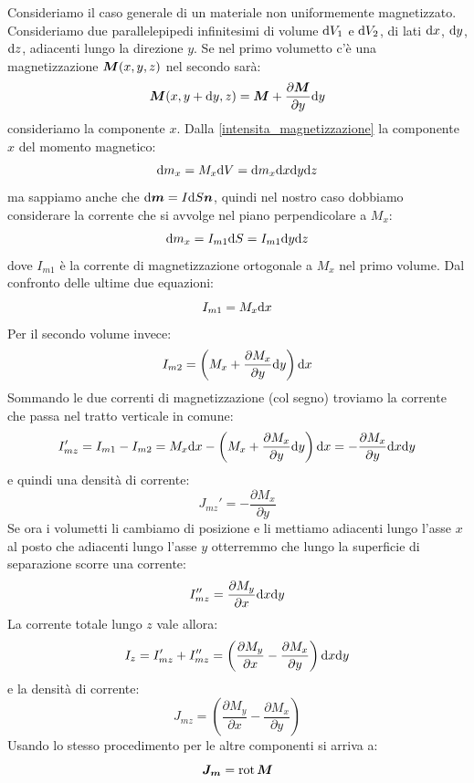 Consideriamo il caso generale di un materiale non uniformemente magnetizzato. Consideriamo due parallelepipedi infinitesimi di volume $\mathrm{d} V_1$ e $\mathrm{d} V_2$, di lati $\mathrm{d} x$, $\mathrm{d} y$, $\mathrm{d} z$, adiacenti lungo la direzione $y$. Se nel primo volumetto c'è una magnetizzazione $\boldsymbol{M}(x,y,z)$ nel secondo sarà:
\begin{equation}
  \boldsymbol{M}(x,y+\mathrm{d} y,z)=\boldsymbol{M}+\frac{\partial\boldsymbol{M}}{\partial y}\mathrm{d} y
\end{equation}
consideriamo la componente $x$. Dalla \eqref{intensita_magnetizzazione} la componente $x$ del momento magnetico:
\begin{equation}
  \mathrm{d} m_x=M_x\mathrm{d} V=\mathrm{d} m_x\mathrm{d} x\mathrm{d} y\mathrm{d} z
\end{equation}
ma sappiamo anche che $\mathrm{d} \boldsymbol{m}=I\mathrm{d} S\boldsymbol{n}$, quindi nel nostro caso dobbiamo considerare la corrente che si avvolge nel piano perpendicolare a $M_x$:
\begin{equation}
  \mathrm{d} m_x=I_{m1}\mathrm{d} S=I_{m1}\mathrm{d} y\mathrm{d} z
\end{equation}
dove $I_{m1}$ è la corrente di magnetizzazione ortogonale a $M_x$ nel primo volume. Dal confronto delle ultime due equazioni:
\begin{equation}
  I_{m1}=M_x\mathrm{d} x
\end{equation}
Per il secondo volume invece:
\begin{equation}
  I_{m2}=\left(M_x+\frac{\partial M_x}{\partial y}\mathrm{d} y\right)\mathrm{d} x
\end{equation}
Sommando le due correnti di magnetizzazione (col segno) troviamo la corrente che passa nel tratto verticale in comune:
\begin{equation}
  I_{mz}'=I_{m1}-I_{m2}=M_x\mathrm{d} x-\left(M_x+\frac{\partial M_x}{\partial y}\mathrm{d} y\right)\mathrm{d} x=-\frac{\partial M_x}{\partial y}\mathrm{d} x\mathrm{d} y
\end{equation}
e quindi una densità di corrente:
\begin{equation}
  J_{mz}'=-\frac{\partial M_x}{\partial y}
\end{equation}
Se ora i volumetti li cambiamo di posizione e li mettiamo adiacenti lungo l'asse $x$ al posto che adiacenti lungo l'asse $y$ otterremmo che lungo la superficie di separazione scorre una corrente:
\begin{equation}
  I_{mz}''=\frac{\partial M_y}{\partial x}\mathrm{d} x\mathrm{d} y
\end{equation}
La corrente totale lungo $z$ vale allora:
\begin{equation}
  I_z=I_{mz}'+I_{mz}''=\left(\frac{\partial M_y}{\partial x}-\frac{\partial M_x}{\partial y}\right)\mathrm{d} x\mathrm{d} y
\end{equation}
e la densità di corrente:
\begin{equation}
  J_{mz}=\left(\frac{\partial M_y}{\partial x}-\frac{\partial M_x}{\partial y}\right)
\end{equation}
Usando lo stesso procedimento per le altre componenti si arriva a:
\begin{equation}
  \boldsymbol{J_m}=\operatorname{rot}\boldsymbol{M}
  \label{99}
\end{equation}

